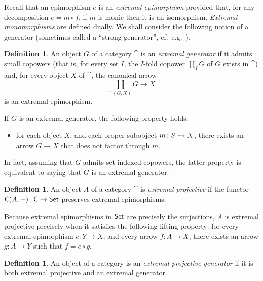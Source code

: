 \documentclass[a4paper,10pt,reqno]{amsart}
\theoremstyle{definition}
\newtheorem{definition}[theorem]{Definition}
\theoremstyle{remark}
\begin{document}
Recall that an epimorphism $e$ is an \emph{extremal epimorphism} provided that, for any decomposition $e= m\circ f$, if $m$ is monic then it is an isomorphism. \emph{Extremal monomorphisms} are defined dually. We shall consider the following notion of a generator (sometimes called a ``strong generator'', cf.\ e.g.\ \cite{ar94book}).

\begin{definition}
An object $G$ of a category $\cat$ is an \emph{extremal generator} if it admits small copowers (that is, for every set $I$, the $I$-fold copower $\coprod_I{G}$ of $G$ exists in $\cat$) and, for every object $X$ of $\cat$, the canonical arrow
\[
\coprod_{\cat(G,X)}{G} \to X
\]
is an extremal epimorphism.
\end{definition}

If $G$ is an extremal generator, the following property holds:
\begin{itemize}
\item for each object $X$, and each proper subobject $m\colon S\rightarrowtail X$, there exists an arrow $G\to X$ that does not factor through $m$.
\end{itemize}
%
In fact, assuming that $G$ admits set-indexed copowers, the latter property is equivalent to saying that $G$ is an extremal generator. 

\begin{definition}
An object $A$ of a category $\cat$ is \emph{extremal projective} if the functor ${\sf C}(A,-)\colon {\sf C} \to {\sf Set}$ preserves extremal epimorphisms. 
\end{definition}

Because extremal epimorphisms in ${\sf Set}$ are precisely the surjections, $A$ is extremal projective precisely when it satisfies the following lifting property: for every extremal epimorphism $e\colon Y\to X$, and every arrow $f\colon A\to X$, there exists an arrow $g\colon A\to Y$ such that $f = e\circ g$.

\begin{definition}\label{def:extremal-projective-generator}
An object of a category is an \emph{extremal projective generator} if it is both extremal projective and an extremal generator.
\end{definition}
\end{document}
